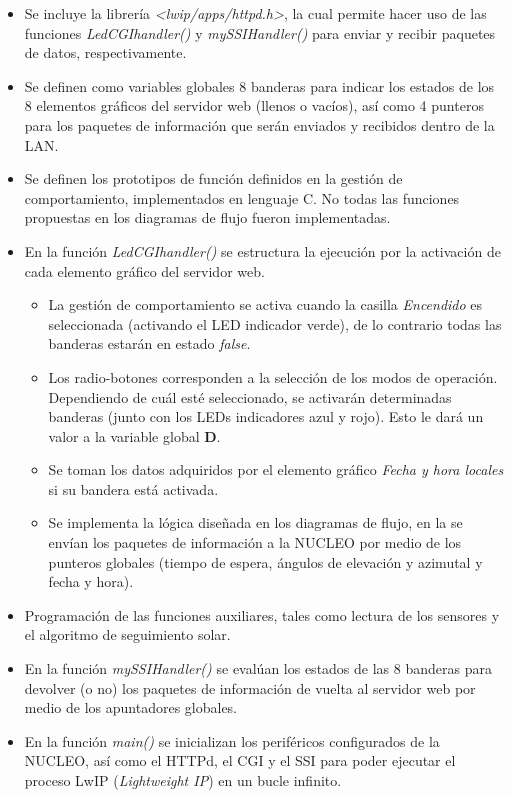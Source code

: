 \begin{itemize}
    \item Se incluye la librería \textit{<lwip/apps/httpd.h>}, la cual permite hacer uso de las funciones \textit{LedCGIhandler()} y \textit{mySSIHandler()} para enviar y recibir paquetes de datos, respectivamente.
    \item Se definen como variables globales 8 banderas para indicar los estados de los 8 elementos gráficos del servidor web (llenos o vacíos), así como 4 punteros para los paquetes de información que serán enviados y recibidos dentro de la LAN.
    \item Se definen los prototipos de función definidos en la gestión de comportamiento, implementados en lenguaje C. No todas las funciones propuestas en los diagramas de flujo fueron implementadas.
    \item En la función \textit{LedCGIhandler()} se estructura la ejecución por la activación de cada elemento gráfico del servidor web.
    \begin{itemize}
        \item La gestión de comportamiento se activa cuando la casilla \textit{Encendido} es seleccionada (activando el LED indicador verde), de lo contrario todas las banderas estarán en estado \textit{false}.
        \item Los radio-botones corresponden a la selección de los modos de operación. Dependiendo de cuál esté seleccionado, se activarán determinadas banderas (junto con los LEDs indicadores azul y rojo). Esto le dará un valor a la variable global \textbf{D}. 
        \item Se toman los datos adquiridos por el elemento gráfico \textit{Fecha y hora locales} si su bandera está activada.
        \item Se implementa la lógica diseñada en los diagramas de flujo, en la se envían los paquetes de información a la NUCLEO por medio de los punteros globales (tiempo de espera, ángulos de elevación y azimutal y fecha y hora).
    \end{itemize}
    \item Programación de las funciones auxiliares, tales como lectura de los sensores y el algoritmo de seguimiento solar.
    \item En la función \textit{mySSIHandler()} se evalúan los estados de las 8 banderas para devolver (o no) los paquetes de información de vuelta al servidor web por medio de los apuntadores globales.
    \item En la función \textit{main()} se inicializan los periféricos configurados de la NUCLEO, así como el HTTPd, el CGI y el SSI para poder ejecutar el proceso LwIP (\textit{Lightweight IP}) en un bucle infinito.
\end{itemize}

